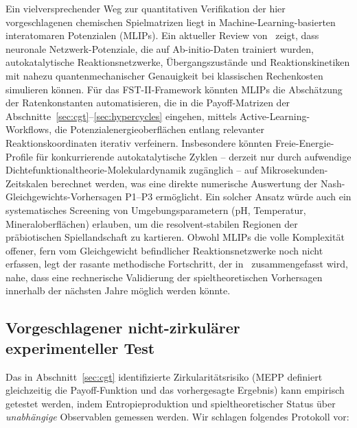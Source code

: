 \documentclass[12pt,a4paper]{article}
\theoremstyle{remark}
\begin{document}
Ein vielversprechender Weg zur quantitativen Verifikation der hier vorgeschlagenen chemischen Spielmatrizen liegt in Machine-Learning-basierten interatomaren Potenzialen (MLIPs). Ein aktueller Review von~\citet{AntonStirnemann2026} zeigt, dass neuronale Netzwerk-Potenziale, die auf Ab-initio-Daten trainiert wurden, autokatalytische Reaktionsnetzwerke, Übergangszustände und Reaktionskinetiken mit nahezu quantenmechanischer Genauigkeit bei klassischen Rechenkosten simulieren können. Für das FST-II-Framework könnten MLIPs die Abschätzung der Ratenkonstanten automatisieren, die in die Payoff-Matrizen der Abschnitte~\ref{sec:cgt}--\ref{sec:hypercycles} eingehen, mittels Active-Learning-Workflows, die Potenzialenergieoberflächen entlang relevanter Reaktionskoordinaten iterativ verfeinern. Insbesondere könnten Freie-Energie-Profile für konkurrierende autokatalytische Zyklen -- derzeit nur durch aufwendige Dichtefunktionaltheorie-Molekulardynamik zugänglich -- auf Mikrosekunden-Zeitskalen berechnet werden, was eine direkte numerische Auswertung der Nash-Gleichgewichts-Vorhersagen P1--P3 ermöglicht. Ein solcher Ansatz würde auch ein systematisches Screening von Umgebungsparametern (pH, Temperatur, Mineraloberflächen) erlauben, um die resolvent-stabilen Regionen der präbiotischen Spiellandschaft zu kartieren. Obwohl MLIPs die volle Komplexität offener, fern vom Gleichgewicht befindlicher Reaktionsnetzwerke noch nicht erfassen, legt der rasante methodische Fortschritt, der in~\citep{AntonStirnemann2026} zusammengefasst wird, nahe, dass eine rechnerische Validierung der spieltheoretischen Vorhersagen innerhalb der nächsten Jahre möglich werden könnte.

\subsection{Vorgeschlagener nicht-zirkulärer experimenteller Test}
\label{sec:noncircular-test}

Das in Abschnitt~\ref{sec:cgt} identifizierte Zirkularitätsrisiko (MEPP definiert gleichzeitig die Payoff-Funktion und das vorhergesagte Ergebnis) kann empirisch getestet werden, indem Entropieproduktion und spieltheoretischer Status über \emph{unabhängige} Observablen gemessen werden. Wir schlagen folgendes Protokoll vor:
\end{document}

